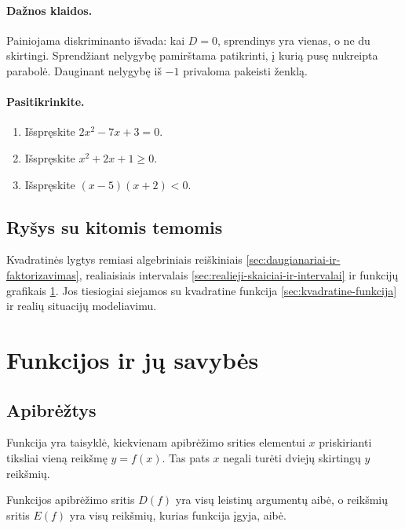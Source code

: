 \paragraph{Dažnos klaidos.}
Painiojama diskriminanto išvada: kai $D=0$, sprendinys yra vienas, o ne du skirtingi. Sprendžiant nelygybę pamirštama patikrinti, į kurią pusę nukreipta parabolė. Dauginant nelygybę iš $-1$ privaloma pakeisti ženklą.

\paragraph{Pasitikrinkite.}
\begin{enumerate}
\item Išspręskite $2x^2-7x+3=0$.
\item Išspręskite $x^2+2x+1\ge0$.
\item Išspręskite $(x-5)(x+2)<0$.
\end{enumerate}

\subsection{Ryšys su kitomis temomis}

Kvadratinės lygtys remiasi algebriniais reiškiniais \ref{sec:daugianariai-ir-faktorizavimas}, realiaisiais intervalais \ref{sec:realieji-skaiciai-ir-intervalai} ir funkcijų grafikais \ref{sec:funkcijos-ir-ju-savybes}. Jos tiesiogiai siejamos su kvadratine funkcija \ref{sec:kvadratine-funkcija} ir realių situacijų modeliavimu.

\section{Funkcijos ir jų savybės}\label{sec:funkcijos-ir-ju-savybes}

\subsection{Apibrėžtys}

\begin{apibreztis}
Funkcija yra taisyklė, kiekvienam apibrėžimo srities elementui $x$ priskirianti tiksliai vieną reikšmę $y=f(x)$. Tas pats $x$ negali turėti dviejų skirtingų $y$ reikšmių.
\end{apibreztis}

\begin{apibreztis}
Funkcijos apibrėžimo sritis $D(f)$ yra visų leistinų argumentų aibė, o reikšmių sritis $E(f)$ yra visų reikšmių, kurias funkcija įgyja, aibė.
\end{apibreztis}

